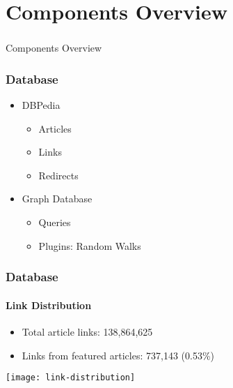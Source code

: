 \section[Components]{Components Overview}

\begin{frame}
  \frametitle{}
  \begin{center}
    {\Huge Components Overview}
  \end{center}
\end{frame}


\begin{frame}
    \centering
    \resizebox{\textwidth}{!}{%
      
    }
\end{frame}


\begin{frame}
    \frametitle{Database}
    \centering

    \begin{itemize}
      \item DBPedia
      \begin{itemize}
        \item Articles
        \item Links
        \item Redirects
      \end{itemize}
      \item Graph Database
      \begin{itemize}
        \item Queries
        \item Plugins: Random Walks
      \end{itemize}
    \end{itemize}

\end{frame}

\begin{frame}
    \frametitle{Database}
    \framesubtitle{Link Distribution}
    \centering

    \begin{itemize}
      \item Total article links: 138,864,625 %
      \item Links from featured articles: 737,143 (0.53\%)
    \end{itemize}

    \texttt{[image: link-distribution]}
\end{frame}


